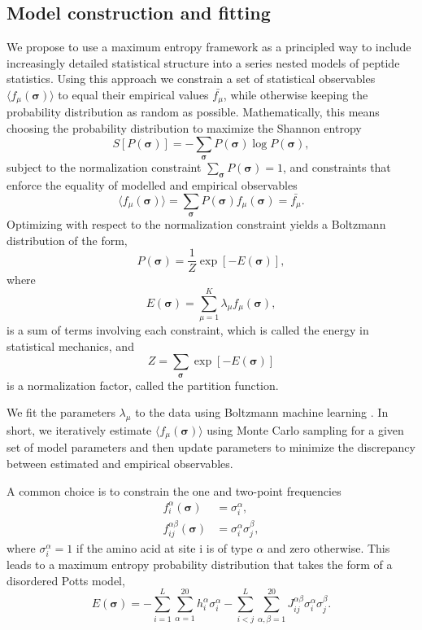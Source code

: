 \documentclass[superscriptaddress,twocolumn,pre]{revtex4}
\newcommand{\B}{\boldsymbol}
\newcommand{\<}{\langle}
\renewcommand{\>}{\rangle}
\begin{document}
\subsection{Model construction and fitting}
We propose to use a maximum entropy framework as a principled way to include increasingly detailed statistical structure into a series nested models of peptide statistics. Using this approach we constrain a set of statistical observables $\langle f_\mu(\boldsymbol \sigma)\rangle$ to equal their empirical values $\bar{f_\mu}$, while otherwise keeping the probability distribution as random as possible. Mathematically, this means choosing the probability distribution to maximize the Shannon entropy
\begin{equation}
    S[P(\B \sigma)] = - \sum_{\B \sigma} P(\B \sigma) \log P(\B \sigma),
\end{equation}
subject to the normalization constraint $\sum_{\B \sigma} P(\B \sigma) = 1$, and constraints that enforce the equality of modelled and empirical observables
\begin{equation}
    \langle f_\mu(\boldsymbol \sigma)\rangle = \sum_{\boldsymbol \sigma} P(\boldsymbol \sigma) f_\mu(\boldsymbol \sigma) = \bar{f_\mu}.
\end{equation}
Optimizing with respect to the normalization constraint yields a Boltzmann distribution of the form,
\begin{equation}
    P(\boldsymbol \sigma) = \frac{1}{Z} \exp\left[ -E(\B \sigma) \right],
\end{equation}
where
\begin{equation}
 E(\B \sigma) = \sum_{\mu=1}^K \lambda_\mu f_\mu(\boldsymbol \sigma),
\end{equation}
is a sum of terms involving each constraint, which is called the energy in statistical mechanics, and 
\begin{equation}
    Z = \sum_{\B \sigma} \exp \left[ - E(\B \sigma) \right]
\end{equation}
is a normalization factor, called the partition function.

We fit the parameters $\lambda_\mu$ to the data using Boltzmann machine learning \cite{Ackley1985}. In short, we iteratively estimate $\langle f_\mu(\B \sigma)\rangle$ using Monte Carlo sampling for a given set of model parameters and then update parameters to minimize the discrepancy between estimated and empirical observables.

A common choice is to constrain the one and two-point frequencies
\begin{align}
    f_i^\alpha(\B \sigma) &= \sigma_i^\alpha, \\
    f_{ij}^{\alpha\beta}(\B \sigma) &= \sigma_i^\alpha \sigma_j^\beta,
\end{align}
where $\sigma_i^\alpha = 1$ if the amino acid at site i is of type $\alpha$ and zero otherwise.
This leads to a maximum entropy probability distribution that takes the form of a disordered Potts model,
\begin{equation}
    E(\boldsymbol \sigma) = - \sum_{i=1}^L \sum_{\alpha = 1}^{20} h_i^\alpha \sigma_i^\alpha - \sum_{i<j}^L \sum_{\alpha,\beta = 1}^{20} J_{ij}^{\alpha \beta}  \sigma_i^\alpha \sigma_j^\beta.
\end{equation}
\end{document}
